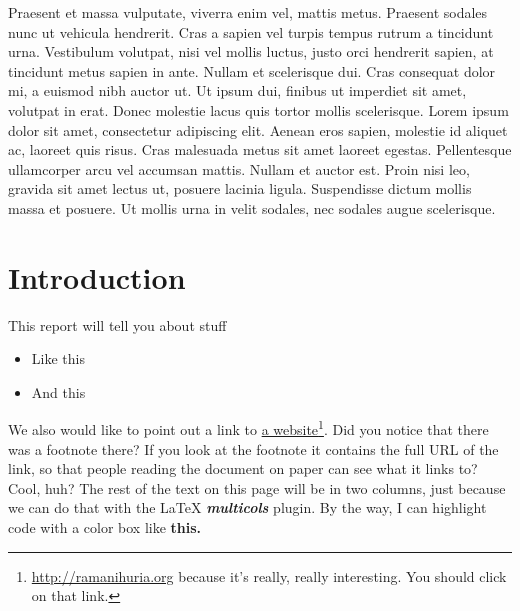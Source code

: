 \documentclass[a4paper,12pt,twoside]{article}
\begin{document}
\begin{multicols}{2}
Praesent et massa vulputate, viverra enim vel, mattis metus. Praesent sodales nunc ut vehicula hendrerit. Cras a sapien vel turpis tempus rutrum a tincidunt urna. Vestibulum volutpat, nisi vel mollis luctus, justo orci hendrerit sapien, at tincidunt metus sapien in ante. Nullam et scelerisque dui. Cras consequat dolor mi, a euismod nibh auctor ut. Ut ipsum dui, finibus ut imperdiet sit amet, volutpat in erat. Donec molestie lacus quis tortor mollis scelerisque. Lorem ipsum dolor sit amet, consectetur adipiscing elit. Aenean eros sapien, molestie id aliquet ac, laoreet quis risus. Cras malesuada metus sit amet laoreet egestas. Pellentesque ullamcorper arcu vel accumsan mattis. Nullam et auctor est. Proin nisi leo, gravida sit amet lectus ut, posuere lacinia ligula. Suspendisse dictum mollis massa et posuere. Ut mollis urna in velit sodales, nec sodales augue scelerisque.

\end{multicols}


\newpage
\section{Introduction}
\label{Introduction}

This report will tell you about stuff

\begin{itemize}
  \item Like this
  \item And this
\end{itemize}

We also would like to point out a link to  \href{https://ramanihuria.org}{a website}\footnote{\url{http://ramanihuria.org}\color{RHgrey} { }because it's really, really interesting. You should click on that link.}. Did you notice that there was a footnote there? If you look at the footnote it contains the full URL of the link, so that people reading the document on paper can see what it links to? Cool, huh? The rest of the text on this page will be in two columns, just because we can do that with the \LaTeX{} \textbf{\textit{multicols}} plugin. By the way, I can highlight code with a color box like \textbf{\colorbox{code}{this.}}
\end{document}
